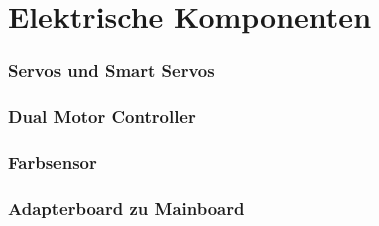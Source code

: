 \section{Elektrische Komponenten}

\begin{frame}
	\frametitle{Servos und Smart Servos}
	
\end{frame}

\begin{frame}
	\frametitle{Dual Motor Controller}
	
\end{frame}

\begin{frame}
	\frametitle{Farbsensor}
	
\end{frame}

\begin{frame}
	\frametitle{Adapterboard zu Mainboard}
	
\end{frame}